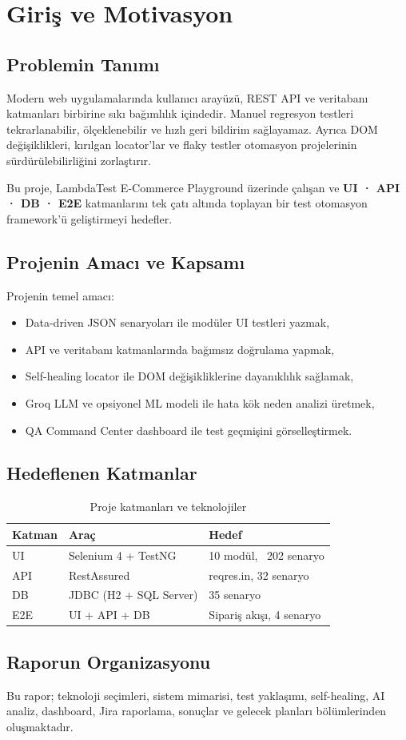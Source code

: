 \chapter{Giriş ve Motivasyon}

\section{Problemin Tanımı}
Modern web uygulamalarında kullanıcı arayüzü, REST API ve veritabanı katmanları birbirine sıkı bağımlılık içindedir. Manuel regresyon testleri tekrarlanabilir, ölçeklenebilir ve hızlı geri bildirim sağlayamaz. Ayrıca DOM değişiklikleri, kırılgan locator'lar ve flaky testler otomasyon projelerinin sürdürülebilirliğini zorlaştırır.

Bu proje, LambdaTest E-Commerce Playground üzerinde çalışan ve \textbf{UI · API · DB · E2E} katmanlarını tek çatı altında toplayan bir test otomasyon framework'ü geliştirmeyi hedefler.

\section{Projenin Amacı ve Kapsamı}
Projenin temel amacı:
\begin{itemize}
  \item Data-driven JSON senaryoları ile modüler UI testleri yazmak,
  \item API ve veritabanı katmanlarında bağımsız doğrulama yapmak,
  \item Self-healing locator ile DOM değişikliklerine dayanıklılık sağlamak,
  \item Groq LLM ve opsiyonel ML modeli ile hata kök neden analizi üretmek,
  \item QA Command Center dashboard ile test geçmişini görselleştirmek.
\end{itemize}

\section{Hedeflenen Katmanlar}
\begin{table}[H]
  \centering
  \caption{Proje katmanları ve teknolojiler}
  \begin{tabular}{@{}lll@{}}
    \toprule
    \textbf{Katman} & \textbf{Araç} & \textbf{Hedef} \\
    \midrule
    UI & Selenium 4 + TestNG & 10 modül, ~202 senaryo \\
    API & RestAssured & reqres.in, 32 senaryo \\
    DB & JDBC (H2 + SQL Server) & 35 senaryo \\
    E2E & UI + API + DB & Sipariş akışı, 4 senaryo \\
    \bottomrule
  \end{tabular}
\end{table}

\section{Raporun Organizasyonu}
Bu rapor; teknoloji seçimleri, sistem mimarisi, test yaklaşımı, self-healing, AI analiz, dashboard, Jira raporlama, sonuçlar ve gelecek planları bölümlerinden oluşmaktadır.

